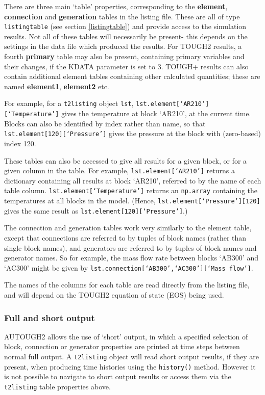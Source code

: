 There are three main `table' properties, corresponding to the \textbf{element}, \textbf{connection} and \textbf{generation} tables in the listing file.  These are all of type \texttt{listingtable} (see section \ref{listingtable}) and provide access to the simulation results.  Not all of these tables will necessarily be present- this depends on the settings in the data file which produced the results.  For TOUGH2 results, a fourth \textbf{primary} table may also be present, containing primary variables and their changes, if the KDATA parameter is set to 3.  TOUGH+ results can also contain additional element tables containing other calculated quantities; these are named \textbf{element1}, \textbf{element2} etc.

For example, for a \texttt{t2listing} object \texttt{lst}, \texttt{lst.element[`AR210'][`Temperature']} gives the temperature at block `AR210', at the current time.  Blocks can also be identified by index rather than name, so that \texttt{lst.element[120][`Pressure']} gives the pressure at the block with (zero-based) index 120.

These tables can also be accessed to give all results for a given block, or for a given column in the table.  For example, \texttt{lst.element[`AR210']} returns a dictionary containing all results at block `AR210', referred to by the name of each table column.  \texttt{lst.element[`Temperature']} returns an \texttt{np.array} containing the temperatures at all blocks in the model.  (Hence, \texttt{lst.element[`Pressure'][120]} gives the same result as \texttt{lst.element[120][`Pressure']}.)

The connection and generation tables work very similarly to the element table, except that connections are referred to by tuples of block names (rather than single block names), and generators are referred to by tuples of block names and generator names.  So for example, the mass flow rate between blocks `AB300' and `AC300' might be given by \texttt{lst.connection[`AB300',`AC300'][`Mass flow']}.

The names of the columns for each table are read directly from the listing file, and will depend on the TOUGH2 equation of state (EOS) being used.

\subsubsection{Full and short output}

AUTOUGH2 allows the use of `short' output, in which a specified selection of block, connection or generator properties are printed at time steps between normal full output.  A \texttt{t2listing} object will read short output results, if they are present, when producing time histories using the \texttt{history()} method.  However it is not possible to navigate to short output results or access them via the \texttt{t2listing} table properties above.

